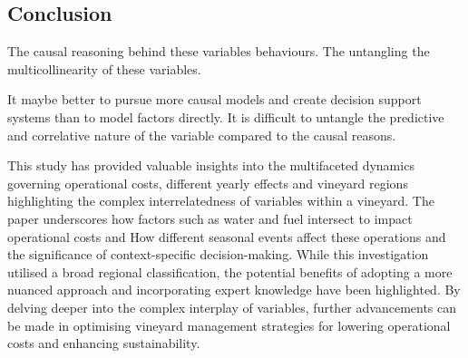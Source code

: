 \documentclass[review,12pt,authoryear]{elsarticle}
\begin{document}
\begin{linenumbers}
\fi

\section{Conclusion}



% 
The causal reasoning behind these variables behaviours. The untangling the multicollinearity of these variables.

It maybe better to pursue more causal models and create decision support systems than to model factors directly. It is difficult to untangle the predictive and correlative nature of the variable compared to the causal reasons.

This study has provided valuable insights into the multifaceted dynamics governing operational costs, different yearly effects and vineyard regions highlighting the complex interrelatedness of variables within a vineyard. The paper underscores how factors such as water and fuel intersect to impact operational costs and How different seasonal events affect these operations and the significance of context-specific decision-making. While this investigation utilised a broad regional classification, the potential benefits of adopting a more nuanced approach and incorporating expert knowledge have been highlighted. By delving deeper into the complex interplay of variables, further advancements can be made in optimising vineyard management strategies for lowering operational costs and enhancing sustainability.





\end{linenumbers}
\end{document}

